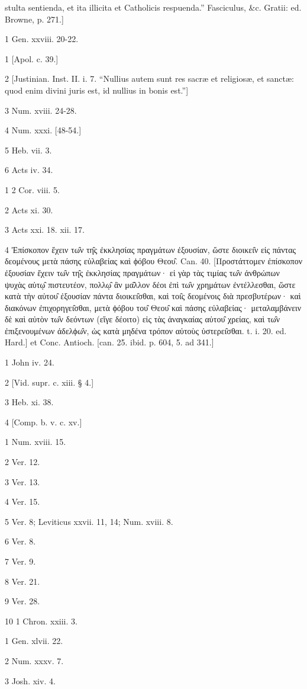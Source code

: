 stulta sentienda, et ita illicita et Catholicis respuenda.” Fasciculus, &c. Gratii: ed. Browne, p. 271.]

1
Gen. xxviii. 20-22.

1
[Apol. c. 39.]

2
[Justinian. Inst. II. i. 7. “Nullius autem sunt res sacræ et religiosæ, et sanctæ: quod enim divini juris est, id nullius in bonis est.”]

3
Num. xviii. 24-28.

4
Num. xxxi. [48-54.]

5
Heb. vii. 3.

6
Acts iv. 34.

1
2 Cor. viii. 5.

2
Acts xi. 30.

3
Acts xxi. 18. xii. 17.

4
Ἐπίσκοπον ἔχειν τω̑ν τη̑ς ἐκκλησίας πραγμάτων ἐξουσίαν, ὥστε διοικει̑ν εἰς πάντας δεομένους μετὰ πάσης εὐλαβείας καὶ ϕόβου Θεου̑. Can. 40. [Προστάττομεν ἐπίσκοπον ἐξουσίαν ἔχειν τω̑ν τη̑ς ἐκκλησίας πραγμάτων· εἰ γὰρ τὰς τιμίας τω̑ν ἀνθρώπων ψυχὰς αὐτῳ̑ πιστευτέον, πολλῳ̑ ἂν μα̑λλον δέοι ἐπὶ τω̑ν χρημάτων ἐντέλλεσθαι, ὥστε κατὰ τὴν αὐτου̑ ἐξουσίαν πάντα διοικει̑σθαι, καὶ τοι̑ς δεομένοις διὰ πρεσβυτέρων· καὶ διακόνων ἐπιχορηγει̑σθαι, μετὰ ϕόβου του̑ Θεου̑ καὶ πάσης εὐλαβείας· μεταλαμβάνειν δὲ καὶ αὐτὸν τω̑ν δεόντων (εἴγε δέοιτο) εἰς τὰς ἀναγκαίας αὐτου̑ χρείας, καὶ τω̑ν ἐπιξενουμένων ἀδελϕω̑ν, ὡς κατὰ μηδένα τρόπον αὐτοὺς ὑστερει̑σθαι. t. i. 20. ed. Hard.] et Conc. Antioch. [can. 25. ibid. p. 604, 5. ad 341.]

1
John iv. 24.

2
[Vid. supr. c. xiii. § 4.]

3
Heb. xi. 38.

4
[Comp. b. v. c. xv.]

1
Num. xviii. 15.

2
Ver. 12.

3
Ver. 13.

4
Ver. 15.

5
Ver. 8; Leviticus xxvii. 11, 14; Num. xviii. 8.

6
Ver. 8.

7
Ver. 9.

8
Ver. 21.

9
Ver. 28.

10
1 Chron. xxiii. 3.

1
Gen. xlvii. 22.

2
Num. xxxv. 7.

3
Josh. xiv. 4.

